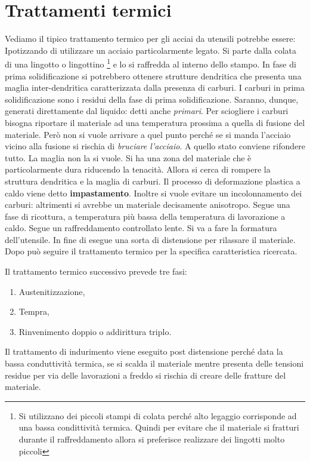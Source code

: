 \section{Trattamenti termici}
Vediamo il tipico trattamento termico per gli acciai da utensili potrebbe essere:
Ipotizzando di utilizzare un acciaio particolarmente legato.
Si parte dalla colata di una lingotto o lingottino%
\footnote{Si utilizzano dei piccoli stampi di colata perché alto legaggio corrisponde ad una bassa condittività termica. Quindi per evitare che il materiale si fratturi durante il raffreddamento allora si preferisce realizzare dei lingotti molto piccoli}
e lo si raffredda al interno dello stampo. 
In fase di prima solidificazione si potrebbero ottenere strutture dendritica che presenta una maglia inter-dendritica caratterizzata dalla presenza di carburi. I carburi in prima solidificazione sono i residui della fase di prima solidificazione. Saranno, dunque, generati direttamente dal liquido: detti anche \textit{primari}. Per sciogliere i carburi bisogna riportare il materiale ad una temperatura prossima a quella di fusione del materiale. Però non si vuole arrivare a quel punto perché se si manda l'acciaio vicino alla fusione si rischia di \emph{bruciare l'acciaio}.
A quello stato conviene rifondere tutto.
La maglia non la si vuole. Si ha una zona del materiale che è particolarmente dura riducendo la tenacità.
Allora si cerca di rompere la struttura dendritica e la maglia di carburi.
Il processo di deformazione plastica a caldo viene detto \textbf{impastamento}. Inoltre si vuole evitare un incolonnamento dei carburi: altrimenti si avrebbe un materiale decisamente anisotropo.
Segue una fase di ricottura, a temperatura più bassa della temperatura di lavorazione a caldo. Segue un raffreddamento controllato lente.
Si va a fare la formatura dell'utensile.
In fine di esegue una sorta di distensione per rilassare il materiale.
Dopo può seguire il trattamento termico per la specifica caratteristica ricercata.

Il trattamento termico successivo prevede tre fasi:
\begin{enumerate}
\item Austenitizzazione,
\item Tempra,
\item Rinvenimento doppio o addirittura triplo.
\end{enumerate}
Il trattamento di indurimento viene eseguito post distensione perché data la bassa conduttività termica, se si scalda il materiale mentre presenta delle tensioni residue per via delle lavorazioni a freddo si rischia di creare delle fratture del materiale.

